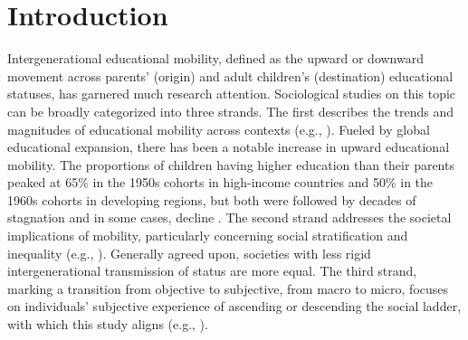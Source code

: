 \section{Introduction}
\label{sec:ch2-introduction}

Intergenerational educational mobility, defined as the upward or downward movement across parents' (origin) and adult children's (destination) educational statuses, has garnered much research attention. Sociological studies on this topic can be broadly categorized into three strands. The first describes the trends and magnitudes of educational mobility across contexts (e.g., \cite{gruijtersTrendsEducationalMobility2019,songLongtermDeclineIntergenerational2020,torcheEducationalMobilityDeveloping2021,xieTrendsSocialMobility2022}). Fueled by global educational expansion, there has been a notable increase in upward educational mobility. The proportions of children having higher education than their parents peaked at 65\% in the 1950s cohorts in high-income countries and 50\% in the 1960s cohorts in developing regions, but both were followed by decades of stagnation and in some cases, decline \parencite{torcheEducationalMobilityDeveloping2021}. The second strand addresses the societal implications of mobility, particularly concerning social stratification and inequality (e.g., \cite{bianChineseSocialStratification2002,goldthorpeSocialMobilityClass1980,yeungHigherEducationExpansion2013}). Generally agreed upon, societies with less rigid intergenerational transmission of status are more equal. The third strand, marking a transition from objective to subjective, from macro to micro, focuses on individuals' subjective experience of ascending or descending the social ladder, with which this study aligns (e.g., \cite{dhooreSocialMobilityLife2019,kwonImpactIntergenerationalMobility2022,schuckDoesIntergenerationalEducational2018,zangFrustratedAchieversSatisfied2016}).

